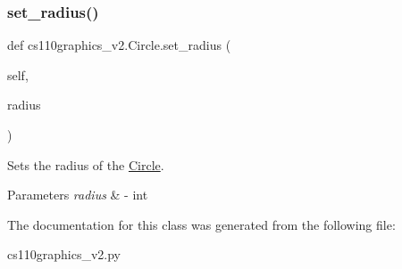 \subsubsection{\texorpdfstring{set\_radius()}{set\_radius()}}
{\footnotesize\ttfamily def cs110graphics\+\_\+v2.\+Circle.\+set\+\_\+radius (\begin{DoxyParamCaption}\item[{}]{self,  }\item[{}]{radius }\end{DoxyParamCaption})}



Sets the radius of the \mbox{\hyperlink{classcs110graphics__v2_1_1Circle}{Circle}}. 


\begin{DoxyParams}{Parameters}
{\em radius} & -\/ int \\
\hline
\end{DoxyParams}


The documentation for this class was generated from the following file\+:\begin{DoxyCompactItemize}
\item 
cs110graphics\+\_\+v2.\+py\end{DoxyCompactItemize}

